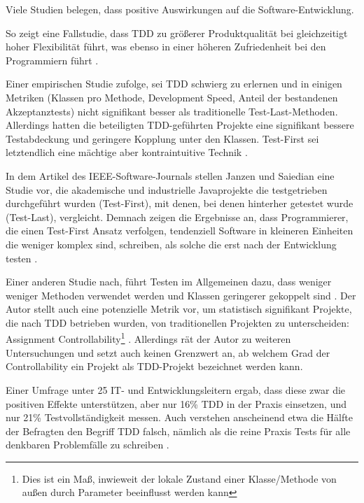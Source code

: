 Viele Studien belegen, dass  positive Auswirkungen auf die Software-Entwicklung.


So zeigt eine Fallstudie, dass TDD zu größerer Produktqualität bei gleichzeitigt hoher Flexibilität führt, was ebenso in einer höheren Zufriedenheit bei den Programmiern führt \citep{hans_wasmus_evaluation_2007}.


Einer empirischen Studie zufolge, sei TDD schwierg zu erlernen und in einigen Metriken (Klassen pro Methode, Development Speed, Anteil der bestandenen Akzeptanztests) nicht signifikant besser als traditionelle Test-Last-Methoden. Allerdings hatten die beteiligten TDD-geführten Projekte eine signifikant bessere Testabdeckung und geringere Kopplung unter den Klassen. Test-First sei letztendlich eine mächtige aber kontraintuitive Technik \citep{madeyski_test-driven_2009}.


In dem Artikel des IEEE-Software-Journals stellen Janzen und Saiedian eine Studie vor, die akademische und industrielle Javaprojekte die testgetrieben durchgeführt wurden (Test-First), mit denen, bei denen hinterher getestet wurde (Test-Last), vergleicht. Demnach zeigen die Ergebnisse an, dass Programmierer, die einen Test-First Ansatz verfolgen, tendenziell Software in kleineren Einheiten die weniger komplex sind, schreiben, als solche die erst nach der Entwicklung testen \citep{janzen_does_2008}.


Einer anderen Studie nach, führt Testen im Allgemeinen dazu, dass weniger weniger Methoden verwendet werden und Klassen geringerer gekoppelt sind \cite{mueller_effect_2006}. Der Autor stellt auch eine potenzielle Metrik vor, um statistisch signifikant Projekte, die nach TDD betrieben wurden, von traditionellen Projekten zu unterscheiden: Assignment Controllability\footnote{Dies ist ein Maß, inwieweit der lokale Zustand einer Klasse/Methode von außen durch Parameter beeinflusst werden kann} \cite{mueller_effect_2006}. Allerdings rät der Autor zu weiteren Untersuchungen und setzt auch keinen Grenzwert an, ab welchem Grad der Controllability ein Projekt als TDD-Projekt bezeichnet werden kann.


Einer Umfrage unter 25 IT- und Entwicklungsleitern ergab, dass diese zwar die positiven Effekte unterstützen, aber nur 16\% TDD in der Praxis einsetzen, und nur 21\% Testvollständigkeit messen. Auch verstehen anscheinend etwa die Hälfte der Befragten den Begriff TDD falsch, nämlich als die reine Praxis Tests für alle denkbaren Problemfälle zu schreiben \citep{stelligent_inc_stelligent_2007}.

